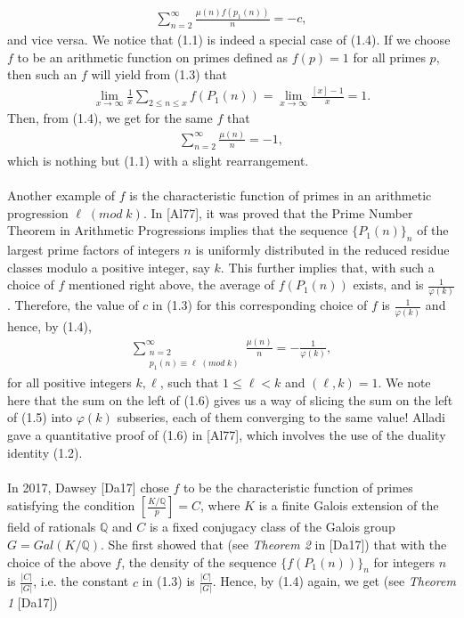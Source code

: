 \documentclass[12pt]{article}
\numberwithin{equation}{section}
\numberwithin{equation}{section}
\begin{document}
\begin{align}
    \sum_{n=2}^{\infty} \frac{\mu(n)f(p_1(n))}{n}=-c,
\end{align}
and vice versa. We notice that (1.1) is indeed a special case of (1.4). If we choose $f$ to be an arithmetic function on primes defined as $f(p)=1$ for all primes $p$, then such an $f$ will yield from (1.3) that 
\begin{align}
    \lim_{x\to \infty}\frac{1}{x}\sum_{2\leq n \leq x}f(P_1(n)) = \lim_{x\to \infty}\frac{[x]-1}{x} = 1. \nonumber
\end{align}
Then, from (1.4), we get for the same $f$ that
\begin{align}
    \sum_{n=2}^{\infty}\frac{\mu(n)}{n} = -1, 
\end{align}
which is nothing but (1.1) with a slight rearrangement. \\ \\
Another example of $f$ is the characteristic function of primes in an arithmetic progression $\ell\;(mod\;k)$. In [Al77], it was proved that the Prime Number Theorem in Arithmetic Progressions implies that the sequence $\{P_1(n)\}_n$ of the largest prime factors of integers $n$ is uniformly distributed in the reduced residue classes modulo a positive integer, say $k$. This further implies that, with such a choice of $f$ mentioned right above, the average of $f(P_1(n))$ exists, and is $\frac{1}{\varphi(k)}$. Therefore, the value of $c$ in (1.3) for this corresponding choice of $f$ is $\frac{1}{\varphi(k)}$ and hence, by (1.4),
\begin{align}
    \sum_{\substack{n=2 \\ p_1(n)\equiv\ell \;(mod\;k)}}^{\infty}\frac{\mu(n)}{n} = -\frac{1}{\varphi(k)},
\end{align}
for all positive integers $k,\ell$, such that $1\leq \ell<k$ and $(\ell,k)=1$. We note here that the sum on the left of (1.6) gives us a way of slicing the sum on the left of (1.5) into $\varphi(k)$ subseries, each of them converging to the same value! Alladi gave a quantitative proof of (1.6) in [Al77], which involves the use of the duality identity (1.2). \\ \\
In 2017, Dawsey [Da17] chose $f$ to be the characteristic function of primes satisfying the condition $\left[\frac{K/\mathbb{Q}}{p}\right]=C$, where $K$ is a finite Galois extension of the field of rationals $\mathbb{Q}$ and $C$ is a fixed conjugacy class of the Galois group $G = Gal(K/\mathbb{Q})$. She first showed that (see \textit{Theorem 2} in [Da17]) that with the choice of the above $f$, the density of the sequence $\{f(P_1(n))\}_n$ for integers $n$ is $\frac{|C|}{|G|}$, i.e. the constant $c$ in (1.3) is $\frac{|C|}{|G|}$. Hence, by (1.4) again, we get (see \textit{Theorem 1} [Da17]) 
\end{document}
